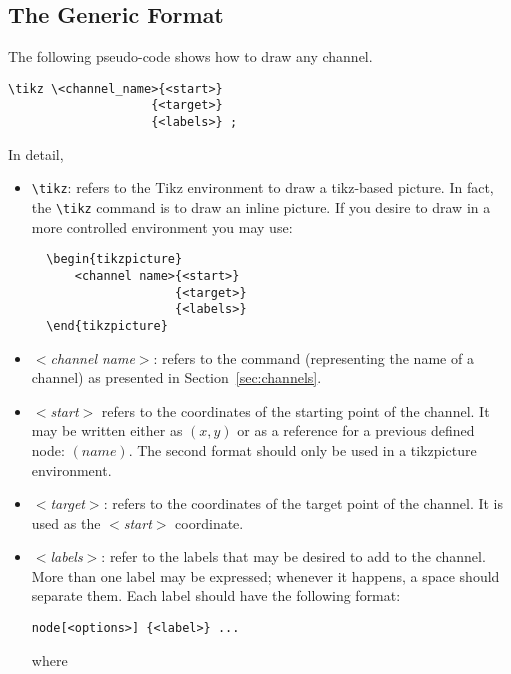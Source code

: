 \documentclass[11pt]{article}
\begin{document}
\subsection{The Generic Format}\label{sec:genericchannels}

The following pseudo-code shows how to draw any channel.

\begin{verbatim}
\tikz \<channel_name>{<start>} 
                    {<target>}
                    {<labels>} ;
\end{verbatim}

In detail, 
\begin{itemize}

\item \verb+\tikz+: refers to the Tikz environment to draw a tikz-based picture. In fact, the \verb+\tikz+ command is to draw an inline picture. If you desire to draw in a more controlled environment you may use:
\begin{verbatim}
  \begin{tikzpicture} 
      <channel name>{<start>}
                    {<target>}
                    {<labels>} 
  \end{tikzpicture}
\end{verbatim}

\item \emph{$<$channel name$>$}: refers to the command (representing the name of a channel) as presented in Section~\ref{sec:channels}.

\item \emph{$<$start$>$} refers to the coordinates of the starting point of the channel. It may be written either as $(x,y)$ or as a reference for a previous defined node: $(name)$. The second format should only be used in a tikzpicture environment.

\item \emph{$<$target$>$}: refers to the coordinates of the target point of the channel. It is used as the \emph{$<$start$>$} coordinate.

\item \emph{$<$labels$>$}: refer to the labels that may be desired to add to the channel. More than one label may be expressed; whenever it happens, a space should separate them. Each label should have the following format:

\begin{verbatim}
node[<options>] {<label>} ...
\end{verbatim}

where 


\end{itemize}
\end{document}
